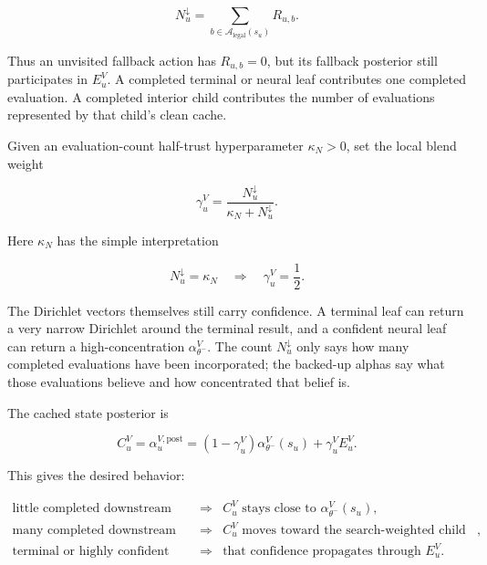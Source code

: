 \documentclass[11pt]{article}
\newcommand{\Legal}{\mathcal{A}_{\mathrm{legal}}}
\begin{document}
\[
N^\downarrow_u
=
\sum_{b\in\Legal(s_u)} R_{u,b}.
\]

Thus an unvisited fallback action has \(R_{u,b}=0\), but its fallback posterior
still participates in \(E^V_u\). A completed terminal or neural leaf contributes
one completed evaluation. A completed interior child contributes the number of
evaluations represented by that child's clean cache.

Given an evaluation-count half-trust hyperparameter \(\kappa_N>0\), set the local
blend weight

\[
\gamma^V_u
=
\frac{N^\downarrow_u}{\kappa_N+N^\downarrow_u}.
\]

Here \(\kappa_N\) has the simple interpretation

\[
N^\downarrow_u=\kappa_N
\quad\Longrightarrow\quad
\gamma^V_u=\frac12.
\]

The Dirichlet vectors themselves still carry confidence. A terminal leaf can
return a very narrow Dirichlet around the terminal result, and a confident neural
leaf can return a high-concentration \(\alpha^V_{\theta^-}\). The count
\(N^\downarrow_u\) only says how many completed evaluations have been incorporated;
the backed-up alphas say what those evaluations believe and how concentrated
that belief is.

The cached state posterior is

\[
C^V_u
=
\alpha^{V,\mathrm{post}}_u
=
(1-\gamma^V_u)\alpha_{\theta^-}^V(s_u)
+
\gamma^V_u E^V_u.
\]

This gives the desired behavior:

\[
\begin{array}{rcl}
\text{little completed downstream work} &\Rightarrow&
C^V_u \text{ stays close to } \alpha_{\theta^-}^V(s_u),\\[2pt]
\text{many completed downstream evaluations} &\Rightarrow&
C^V_u \text{ moves toward the search-weighted child posterior},\\[2pt]
\text{terminal or highly confident child alpha} &\Rightarrow&
\text{that confidence propagates through } E^V_u.
\end{array}
\]
\end{document}
